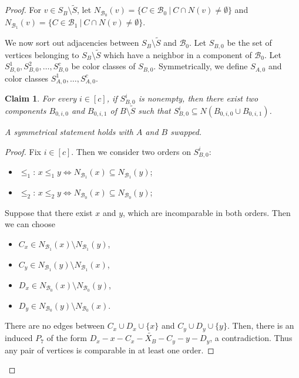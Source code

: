 \documentclass[11pt,a4paper]{article}
\newtheorem{claim}[theorem]{Claim}
\theoremstyle{definition}
\begin{document}
\begin{proof}
For $v \in S_B \setminus \widetilde{S}$, let $N_{\mathcal{B}_0}(v) = \{C \in \mathcal{B}_0~|~C \cap N(v) \neq \emptyset\}$
    and $N_{\mathcal{B}_1}(v) = \{C \in \mathcal{B}_1~|~C \cap N(v) \neq \emptyset\}$.


We now sort out adjacencies between $S_B \setminus \widetilde{S}$ and $\mathcal{B}_0$. 
Let $S_{B,0} $ be the set of vertices belonging to $S_B\setminus \widetilde{S}$ which have a
neighbor in a component of $\mathcal{B}_0$. Let $S_{B,0}^1, S_{B,0}^2, \dots, S_{B,0}^c$ be color classes of $S_{B,0}$. Symmetrically, we define $S_{A,0}$ and color classes
$S_{A,0}^1,\ldots,S_{A,0}^c$. 

\begin{claim}\label{cl:B0_vertices}
For every $i \in [c]$, if $S_{B,0}^i$ is nonempty, then there exist
two components $B_{0,i,0}$ and $B_{0,i,1}$ of $B \setminus \widetilde{S}$
such that $S_{B,0}^i \subseteq N(B_{0,i,0} \cup B_{0,i,1})$. 

A symmetrical statement holds with $A$ and $B$ swapped.
\end{claim}
\begin{proof}
    Fix $i \in[c]$.
    Then we consider two orders on $S_{B,0}^i$:
    \begin{itemize}
        \item $\leq_1$: $x\leq_1 y \Leftrightarrow N_{\mathcal{B}_1}(x) \subseteq N_{\mathcal{B}_1}(y)$;
         
        \item $\leq_2$: $x\leq_2 y \Leftrightarrow N_{\mathcal{B}_0}(x) \subseteq N_{\mathcal{B}_0}(y)$;
    \end{itemize}
    Suppose that there exist $x$ and $y$, which are incomparable in both orders. Then we can choose
    \begin{itemize}
        \item $C_x\in N_{\mathcal{B}_1}(x) \setminus N_{\mathcal{B}_1}(y)$,
        \item $C_y \in N_{\mathcal{B}_1}(y) \setminus N_{\mathcal{B}_1}(x)$,
        \item $D_x\in N_{\mathcal{B}_0}(x) \setminus N_{\mathcal{B}_0}(y)$,
        \item $D_y\in N_{\mathcal{B}_0}(y) \setminus N_{\mathcal{B}_0}(x)$.
    \end{itemize} 
    There are no edges between $C_x \cup D_x \cup \{x\}$ and $C_y \cup D_y \cup \{y\}$. 
    Then, there is an induced $P_7$ of the form $D_x-x-C_x-\widetilde{X_B}-C_y-y-D_y$, a contradiction.
    Thus any pair of vertices is comparable in at least one order.
    

\end{proof}
\end{proof}
\end{document}
